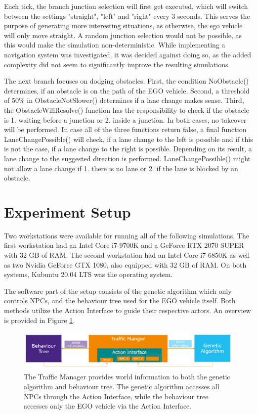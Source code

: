 Each tick, the branch junction selection will first get executed, which will switch between the settings "straight", "left" and "right" every 3 seconds. This serves the purpose of generating more interesting situations, as otherwise, the ego vehicle will only move straight. A random junction selection would not be possible, as this would make the simulation non-deterministic. While implementing a navigation system was investigated, it was decided against doing so, as the added complexity did not seem to significantly improve the resulting simulations.

The next branch focuses on dodging obstacles. First, the condition NoObstacle() determines, if an obstacle is on the path of the EGO vehicle. Second, a threshold of 50\% in ObstacleNotSlower() determines if a lane change makes sense. Third, the ObstacleWillResolve() function has the responsibility to check if the obstacle is 1. waiting before a junction or 2. inside a junction. In both cases, no takeover will be performed. In case all of the three functions return false, a final function LaneChangePossible() will check, if a lane change to the left is possible and if this is not the case, if a lane change to the right is possible. Depending on its result, a lane change to the suggested direction is performed. LaneChangePossible() might not allow a lane change if 1. there is no lane or 2. if the lane is blocked by an obstacle.


\section{Experiment Setup}
\label{sect:implementation:experiment_setup}
Two workstations were available for running all of the following simulations. The first workstation had an Intel Core i7-9700K and a GeForce RTX 2070 SUPER with 32 GB of RAM. The second workstation had an Intel Core i7-6850K as well as two Nvidia GeForce GTX 1080, also equipped with 32 GB of RAM. On both systems, Kubuntu 20.04 LTS was the operating system.

The software part of the setup consists of the genetic algorithm which only controls NPCs, and the behaviour tree used for the EGO vehicle itself. Both methods utilize the Action Interface to guide their respective actors. An overview is provided in Figure \ref{fig:implementation:traffic_manager_structure}.

\begin{figure}[ht] 
	\includegraphics[width=1\linewidth]{figures/tm_structure}
	\caption{The Traffic Manager provides world information to both the genetic algorithm and behaviour tree. The genetic algorithm accesses all NPCs through the Action Interface, while the behaviour tree accesses only the EGO vehicle via the Action Interface.}
	\label{fig:implementation:traffic_manager_structure}
\end{figure}


